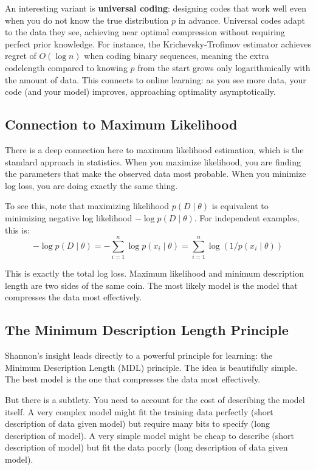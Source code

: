 An interesting variant is \textbf{universal coding}: designing codes that work well even when you do not know the true distribution $p$ in advance. Universal codes adapt to the data they see, achieving near optimal compression without requiring perfect prior knowledge. For instance, the Krichevsky-Trofimov estimator achieves regret of $O(\log n)$ when coding binary sequences, meaning the extra codelength compared to knowing $p$ from the start grows only logarithmically with the amount of data. This connects to online learning: as you see more data, your code (and your model) improves, approaching optimality asymptotically.

\subsection{Connection to Maximum Likelihood}

There is a deep connection here to maximum likelihood estimation, which is the standard approach in statistics. When you maximize likelihood, you are finding the parameters that make the observed data most probable. When you minimize log loss, you are doing exactly the same thing.

To see this, note that maximizing likelihood $p(D \mid \theta)$ is equivalent to minimizing negative log likelihood $-\log p(D \mid \theta)$. For independent examples, this is:
\begin{equation}
-\log p(D \mid \theta) = -\sum_{i=1}^{n} \log p(x_i \mid \theta) = \sum_{i=1}^{n} \log(1/p(x_i \mid \theta))
\end{equation}

This is exactly the total log loss. Maximum likelihood and minimum description length are two sides of the same coin. The most likely model is the model that compresses the data most effectively.

\subsection{The Minimum Description Length Principle}

Shannon's insight leads directly to a powerful principle for learning: the Minimum Description Length (MDL) principle. The idea is beautifully simple. The best model is the one that compresses the data most effectively.

But there is a subtlety. You need to account for the cost of describing the model itself. A very complex model might fit the training data perfectly (short description of data given model) but require many bits to specify (long description of model). A very simple model might be cheap to describe (short description of model) but fit the data poorly (long description of data given model).

